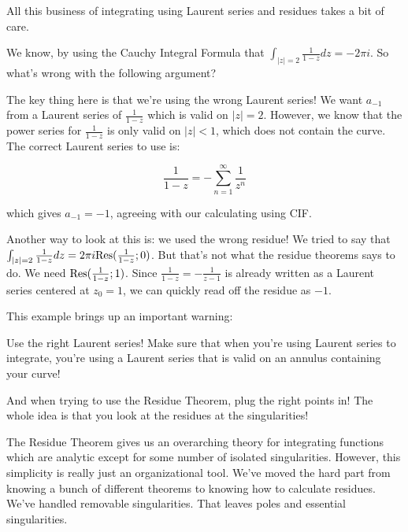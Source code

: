 All this business of integrating using Laurent series and residues takes a bit of care. 

\begin{ex}{}{} We know, by using the Cauchy Integral Formula that $\int_{|z| = 2} \frac{1}{1-z}dz = -2\pi i$. So what's wrong with the following argument?


The key thing here is that we're using the wrong Laurent series! We want $a_{-1}$ from a Laurent series of $\frac{1}{1-z}$ which is valid on $|z| = 2$. However, we know that the power series for $\frac{1}{1-z}$ is only valid on $|z| < 1$, which does not contain the curve. The correct Laurent series to use is:

$$\frac{1}{1-z} = -\sum_{n = 1}^\infty \frac{1}{z^n}$$

\noin which gives $a_{-1} = -1$, agreeing with our calculating using CIF.

Another way to look at this is: we used the wrong residue! We tried to say that $\int_{|z|  = 2} \frac{1}{1-z}dz = 2\pi i\mathrm{Res}(\frac{1}{1-z};0)$. But that's not what the residue theorems says to do. We need $\mathrm{Res}(\frac{1}{1-z};1)$. Since $\frac{1}{1-z} = -\frac{1}{z-1}$ is already written as a Laurent series centered at $z_0 = 1$, we can quickly read off the residue as $-1$.

\end{ex}

This example brings up an important warning:

\begin{warn}{}{} Use the right Laurent series! Make sure that when you're using Laurent series to integrate, you're using a Laurent series that is valid on an annulus containing your curve!

\vspace{10pt}

And when trying to use the Residue Theorem, plug the right points in! The whole idea is that you look at the residues at the singularities!
\end{warn}

The Residue Theorem gives us an overarching theory for integrating functions which are analytic except for some number of isolated singularities. However, this simplicity is really just an organizational tool. We've moved the hard part from knowing a bunch of different theorems to knowing how to calculate residues. We've handled removable singularities. That leaves poles and essential singularities.

